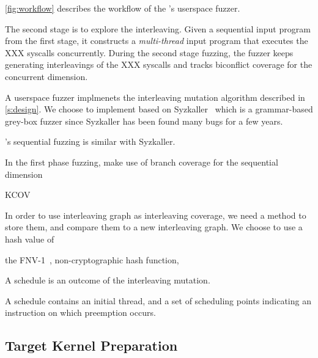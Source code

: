 \autoref{fig:workflow} describes the workflow of the \sys's userspace
fuzzer.
%


%
The second stage is to explore the interleaving. Given a sequential
input program from the first stage, it constructs a
\textit{multi-thread} input program that executes the XXX syscalls
concurrently.
%
During the second stage fuzzing, the fuzzer keeps generating
interleavings of the XXX syscalls and tracks biconflict coverage for
the concurrent dimension.




A userspace fuzzer implmenets the interleaving mutation algorithm
described in \autoref{s:design}.
%
We choose to implement \sys based on Syzkaller~\cite{syzkaller} which
is a grammar-based grey-box fuzzer since Syzkaller has been found many
bugs for a few years.
%

%
\sys's sequential fuzzing is similar with Syzkaller.

In the first phase fuzzing, \sys make use of branch coverage for the
sequential dimension


KCOV~\cite{kcov}


%
In order to use interleaving graph as interleaving coverage, we need a
method to store them, and compare them to a new interleaving graph.
%
We choose to use a hash value of

the FNV-1~\cite{fnv, fnv-go}, non-cryptographic hash function,


A schedule is an outcome of the interleaving mutation.

A schedule contains an initial thread, and a set of scheduling points
indicating an instruction on which preemption occurs.


\subsection{Target Kernel Preparation}
\label{ss:instrumentation}

